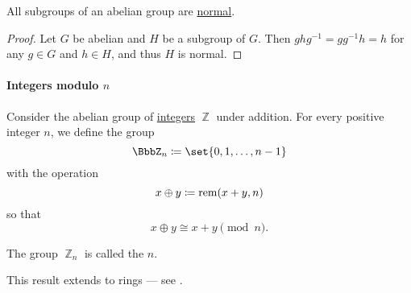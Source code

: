 \begin{proposition}\label{thm:abelian_normal_subgroups}
  All subgroups of an abelian group are \hyperref[def:normal_subgroup]{normal}.
\end{proposition}
\begin{proof}
  Let \( G \) be abelian and \( H \) be a subgroup of \( G \). Then \( g h g^{-1} = gg^{-1} h = h \) for any \( g \in G \) and \( h \in H \), and thus \( H \) is normal.
\end{proof}

\paragraph{Integers modulo \( n \)}

\begin{definition}\label{def:group_of_integers_modulo}
  Consider the abelian group of \hyperref[def:integers]{integers} \( \BbbZ \) under addition. For every positive integer \( n \), we define the group
  \begin{equation*}
    \BbbZ_n \coloneqq \set{ 0, 1, \ldots, n - 1 }
  \end{equation*}
  with the operation
  \begin{equation*}
    x \oplus y \coloneqq \operatorname{rem}(x + y, n)
  \end{equation*}
  so that
  \begin{equation*}
    x \oplus y \cong x + y \pmod n.
  \end{equation*}

  The group \( \BbbZ_n \) is called the  \( n \).
\end{definition}
\begin{comments}
  \item This result extends to rings --- see .
\end{comments}
